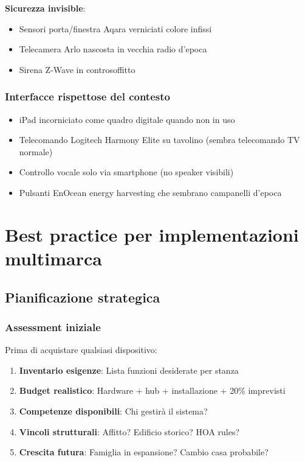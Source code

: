 \textbf{Sicurezza invisible}:
\begin{itemize}
    \item Sensori porta/finestra Aqara verniciati colore infissi
    \item Telecamera Arlo nascosta in vecchia radio d'epoca
    \item Sirena Z-Wave in controsoffitto
\end{itemize}

\subsubsection{Interfacce rispettose del contesto}

\begin{itemize}
    \item iPad incorniciato come quadro digitale quando non in uso
    \item Telecomando Logitech Harmony Elite su tavolino (sembra telecomando TV normale)
    \item Controllo vocale solo via smartphone (no speaker visibili)
    \item Pulsanti EnOcean energy harvesting che sembrano campanelli d'epoca
\end{itemize}

\section{Best practice per implementazioni multimarca}

\subsection{Pianificazione strategica}

\subsubsection{Assessment iniziale}

Prima di acquistare qualsiasi dispositivo:

\begin{enumerate}
    \item \textbf{Inventario esigenze}: Lista funzioni desiderate per stanza
    \item \textbf{Budget realistico}: Hardware + hub + installazione + 20\% imprevisti
    \item \textbf{Competenze disponibili}: Chi gestirà il sistema?
    \item \textbf{Vincoli strutturali}: Affitto? Edificio storico? HOA rules?
    \item \textbf{Crescita futura}: Famiglia in espansione? Cambio casa probabile?
\end{enumerate}

